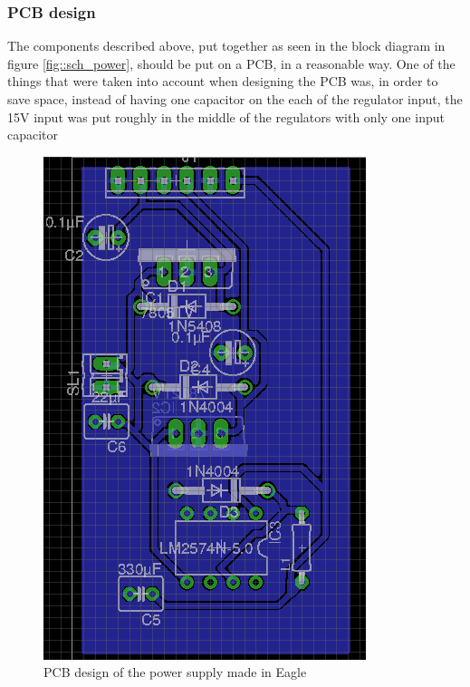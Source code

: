 \subsubsection{PCB design}
The components described above, put together as seen in the block diagram in figure \ref{fig::sch_power}, should be put on a PCB, in a reasonable way. One of the things that were taken into account when designing the PCB was, in order to save space, instead of having one capacitor on the each of the regulator input, the 15V input was put roughly in the middle of the regulators with only one input capacitor

\begin{figure}
\centering
\includegraphics[scale=0.5]{img/pcb_power.png}
\caption{PCB design of the power supply made in Eagle} 
\label{fig::pcb_power}
\end{figure}